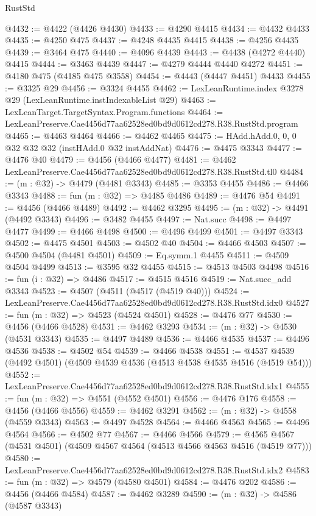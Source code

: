 \begin{lexlean}{RustStd}
\begin{coremodule}
@4432 := @4422 (@4426 @4430)
@4433 := @4290 @4415
@4434 := @4432 @4433
@4435 := @4250 @475
@4437 := @4248 @4435 @4415
@4438 := @4256 @4435
@4439 := @3464 @475
@4440 := @4096 @4439
@4443 := @4438 (@4272 @4440) @4415
@4444 := @3463 @4439
@4447 := @4279 @4444 @4440 @4272
@4451 := @4180 @475 (@4185 @475 @3558)
@4454 := @4443 (@4447 @4451) @4433
@4455 := @3325 @29
@4456 := @3324 @4455
@4462 := LexLeanRuntime.index @3278 @29 (LexLeanRuntime.instIndexableList @29)
@4463 := LexLeanTarget.TargetSyntax.Program.functions
@4464 := LexLeanPreserve.Cae4456d77aa62528ed0bd9d0612cd278.R38.RustStd.program
@4465 := @4463 @4464
@4466 := @4462 @4465
@4475 := HAdd.hAdd.{0, 0, 0} @32 @32 @32 (instHAdd.{0} @32 instAddNat)
@4476 := @4475 @3343
@4477 := @4476 @40
@4479 := @4456 (@4466 @4477)
@4481 := @4462 LexLeanPreserve.Cae4456d77aa62528ed0bd9d0612cd278.R38.RustStd.tl0
@4484 := (m : @32) -> @4479 (@4481 @3343)
@4485 := @3353 @4455
@4486 := @4466 @3343
@4488 := fun (m : @32) => @4485 @4486
@4489 := @4476 @54
@4491 := @4456 (@4466 @4489)
@4492 := @4462 @3295
@4495 := (m : @32) -> @4491 (@4492 @3343)
@4496 := @3482 @4455
@4497 := Nat.succ
@4498 := @4497 @4477
@4499 := @4466 @4498
@4500 := @4496 @4499
@4501 := @4497 @3343
@4502 := @4475 @4501
@4503 := @4502 @40
@4504 := @4466 @4503
@4507 := @4500 @4504 (@4481 @4501)
@4509 := Eq.symm.{1} @4455
@4511 := @4509 @4504 @4499
@4513 := @3595 @32 @4455
@4515 := @4513 @4503 @4498
@4516 := fun (i : @32) => @4486
@4517 := @4515 @4516
@4519 := Nat.succ_add @3343
@4523 := @4507 (@4511 (@4517 (@4519 @40)))
@4524 := LexLeanPreserve.Cae4456d77aa62528ed0bd9d0612cd278.R38.RustStd.idx0
@4527 := fun (m : @32) => @4523 (@4524 @4501)
@4528 := @4476 @77
@4530 := @4456 (@4466 @4528)
@4531 := @4462 @3293
@4534 := (m : @32) -> @4530 (@4531 @3343)
@4535 := @4497 @4489
@4536 := @4466 @4535
@4537 := @4496 @4536
@4538 := @4502 @54
@4539 := @4466 @4538
@4551 := @4537 @4539 (@4492 @4501) (@4509 @4539 @4536 (@4513 @4538 @4535 @4516 (@4519 @54)))
@4552 := LexLeanPreserve.Cae4456d77aa62528ed0bd9d0612cd278.R38.RustStd.idx1
@4555 := fun (m : @32) => @4551 (@4552 @4501)
@4556 := @4476 @176
@4558 := @4456 (@4466 @4556)
@4559 := @4462 @3291
@4562 := (m : @32) -> @4558 (@4559 @3343)
@4563 := @4497 @4528
@4564 := @4466 @4563
@4565 := @4496 @4564
@4566 := @4502 @77
@4567 := @4466 @4566
@4579 := @4565 @4567 (@4531 @4501) (@4509 @4567 @4564 (@4513 @4566 @4563 @4516 (@4519 @77)))
@4580 := LexLeanPreserve.Cae4456d77aa62528ed0bd9d0612cd278.R38.RustStd.idx2
@4583 := fun (m : @32) => @4579 (@4580 @4501)
@4584 := @4476 @202
@4586 := @4456 (@4466 @4584)
@4587 := @4462 @3289
@4590 := (m : @32) -> @4586 (@4587 @3343)

\end{coremodule}
\end{lexlean}
